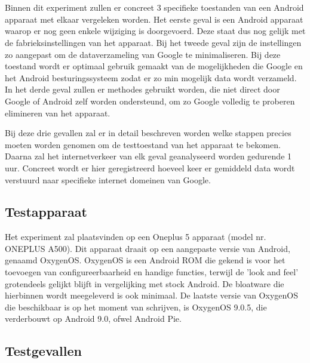 
\chapter{}
\label{ch:methodologie}

Binnen dit experiment zullen er concreet 3 specifieke toestanden van een Android apparaat met elkaar vergeleken worden. Het eerste geval is een Android apparaat waarop er nog geen enkele wijziging is doorgevoerd. Deze staat dus nog gelijk met de fabrieksinstellingen van het apparaat. Bij het tweede geval zijn de instellingen zo aangepast om de dataverzameling van Google te minimaliseren. Bij deze toestand wordt er optimaal gebruik gemaakt van de mogelijkheden die Google en het Android besturingssysteem zodat er zo min mogelijk data wordt verzameld. In het derde geval zullen er methodes gebruikt worden, die niet direct door Google of Android zelf worden ondersteund, om zo Google volledig te proberen elimineren van het apparaat.

Bij deze drie gevallen zal er in detail beschreven worden welke stappen precies moeten worden genomen om de testtoestand van het apparaat te bekomen. Daarna zal het internetverkeer van elk geval geanalyseerd worden gedurende 1 uur. Concreet wordt er hier geregistreerd hoeveel keer er gemiddeld data wordt verstuurd naar specifieke internet domeinen van Google.

\section{Testapparaat}
\label{sec:testapparaat}
Het experiment zal plaatsvinden op een Oneplus 5 apparaat (model nr. ONEPLUS A500). Dit apparaat draait op een aangepaste versie van Android, genaamd OxygenOS. OxygenOS is een Android ROM die gekend is voor het toevoegen van configureerbaarheid en handige functies, terwijl de 'look and feel' grotendeels gelijkt blijft in vergelijking met stock Android. De bloatware die hierbinnen wordt meegeleverd is ook minimaal. De laatste versie van OxygenOS die beschikbaar is op het moment van schrijven, is OxygenOS 9.0.5, die verderbouwt op Android 9.0, ofwel Android Pie.

\section{Testgevallen}
\label{sec:testgevallen}

